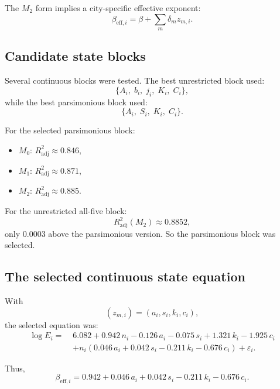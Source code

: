 \documentclass[11pt]{article}
\newcommand{\adjR}{R^2_{\mathrm{adj}}}
\begin{document}
The \(M_2\) form implies a city-specific effective exponent:
\begin{equation}
\beta_{\mathrm{eff},i}
=
\beta + \sum_m \delta_m z_{m,i}.
\label{eq:beta-eff}
\end{equation}

\subsection{Candidate state blocks}

Several continuous blocks were tested. The best unrestricted block used:
\begin{equation}
\{A_i,\; b_i,\; j_i,\; K_i,\; C_i\},
\end{equation}
while the best parsimonious block used:
\begin{equation}
\{A_i,\; S_i,\; K_i,\; C_i\}.
\end{equation}

For the selected parsimonious block:
\begin{itemize}
\item \(M_0\): \(\adjR \approx 0.846\),
\item \(M_1\): \(\adjR \approx 0.871\),
\item \(M_2\): \(\adjR \approx 0.885\).
\end{itemize}

For the unrestricted all-five block:
\begin{equation}
\adjR(M_2) \approx 0.8852,
\end{equation}
only \(0.0003\) above the parsimonious version. So the parsimonious block was selected.

\subsection{The selected continuous state equation}

With
\begin{equation}
(z_{m,i}) = (a_i,s_i,k_i,c_i),
\end{equation}
the selected equation was:
\begin{align}
\log E_i
=\;&
6.082
 + 0.942\,n_i
 - 0.126\,a_i
 - 0.075\,s_i
 + 1.321\,k_i
 - 1.925\,c_i
\nonumber\\
&+ n_i\left(
0.046\,a_i
 + 0.042\,s_i
 - 0.211\,k_i
 - 0.676\,c_i
\right)
 + \varepsilon_i.
\label{eq:selected-state}
\end{align}

Thus,
\begin{equation}
\beta_{\mathrm{eff},i}
=
0.942
 + 0.046\,a_i
 + 0.042\,s_i
 - 0.211\,k_i
 - 0.676\,c_i.
\label{eq:selected-beta-eff}
\end{equation}
\end{document}
